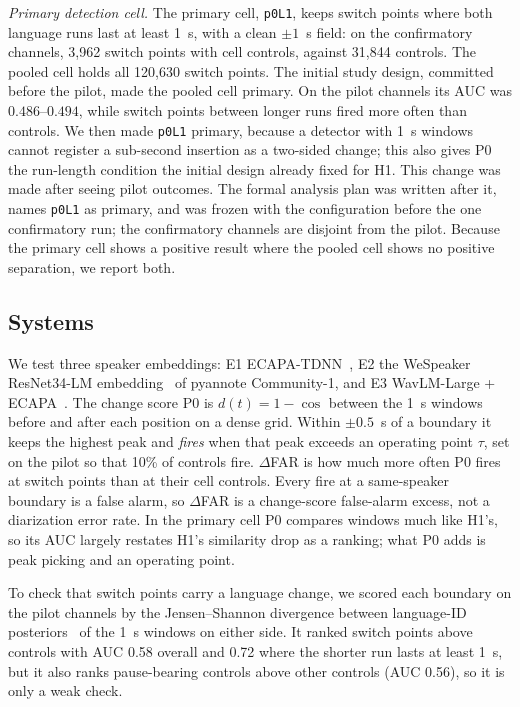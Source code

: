 \documentclass[conference]{IEEEtran}
\begin{document}
\emph{Primary detection cell.} The primary cell, \texttt{p0L1}, keeps switch points where
both language runs last at least 1~s, with a clean $\pm1$~s field: on the confirmatory
channels, 3{,}962 switch points with cell controls, against 31{,}844 controls. The pooled
cell holds all 120{,}630 switch points. The initial study design, committed before the pilot, made the pooled cell primary. On the pilot channels its AUC was $0.486$--$0.494$, while switch points between longer runs fired more often than controls. We then made \texttt{p0L1} primary, because a detector with 1~s windows cannot register a sub-second insertion as a two-sided change; this also gives P0 the run-length condition the initial design already fixed for H1. This change was made after seeing pilot outcomes. The formal analysis plan was written after it, names \texttt{p0L1} as primary, and was frozen with the configuration before the one confirmatory run; the confirmatory channels are disjoint from the pilot. Because the primary cell shows a positive result where the pooled cell shows no positive separation, we report both.

\subsection{Systems}
We test three speaker embeddings: E1 ECAPA-TDNN~\cite{desplanques2020ecapa}, E2 the
WeSpeaker ResNet34-LM embedding~\cite{wang2023wespeaker} of pyannote Community-1, and E3
WavLM-Large + ECAPA~\cite{chen2022wavlm}. The change score P0 is $d(t)=1-\cos$ between the
1~s windows before and after each position on a dense grid. Within $\pm0.5$~s of a boundary
it keeps the highest peak and \emph{fires} when that peak exceeds an operating point $\tau$,
set on the pilot so that 10\% of controls fire. $\Delta$FAR is how much more often P0 fires
at switch points than at their cell controls. Every fire at a same-speaker boundary is a
false alarm, so $\Delta$FAR is a change-score false-alarm excess, not a diarization error
rate. In the primary cell P0 compares windows much like H1's, so its AUC largely restates
H1's similarity drop as a ranking; what P0 adds is peak picking and an operating point.

To check that switch points carry a language change, we scored each boundary on the pilot
channels by the Jensen--Shannon divergence between language-ID
posteriors~\cite{valk2021voxlingua} of the 1~s windows on either side. It ranked switch
points above controls with AUC 0.58 overall and 0.72 where the shorter run lasts at least
1~s, but it also ranks pause-bearing controls above other controls (AUC 0.56), so it is only
a weak check.
\end{document}
